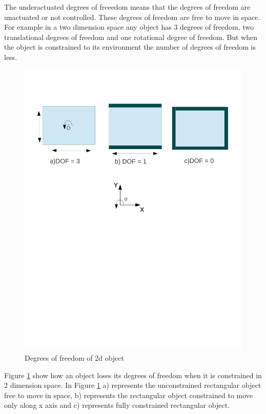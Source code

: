 \begin{itemize}
    The underactuated degrees of freeedom means that the degrees of freedom are unactuated or not controlled. These degrees of freedom are free to move in space. For example in a two dimension space any object has 3 degrees of freedom, two translational degrees of freedom and one rotational degree of freedom. But when the object is constrained to its environment the number of degrees of freedom is less.
    \begin{figure}
    \begin{center}
    \includegraphics[trim = 0mm 130mm 0mm 25mm, scale = 0.75 ]{Bilder/dof2d.pdf}
    \caption{ Degrees of freedom of 2d object}
    \label{fig:dof_2d}
    \end{center}
    \end{figure}
    Figure \ref{fig:dof_2d} show how an object loses its degrees of freedom when it is constrained in 2 dimension space. In Figure \ref{fig:dof_2d} a) represents the unconstrained rectangular object free to move in space, b) represents the rectangular object constrained to move only along x axis and c) represents fully constrained rectangular object. 
    

\end{itemize}
